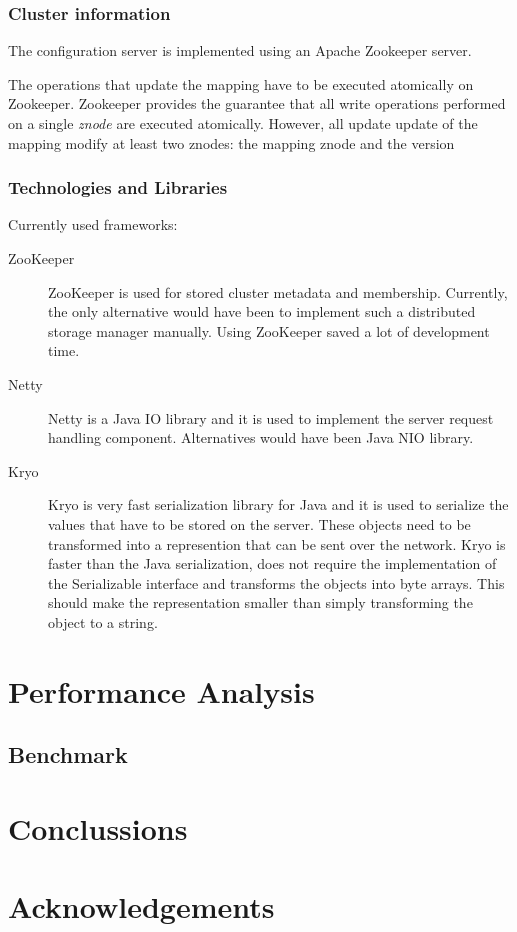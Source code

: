 \documentclass[11pt,a4paper]{globis-book}
\begin{document}
\subsection{Cluster information}
The configuration server is implemented using an Apache Zookeeper server. 

The operations that update the mapping have to be executed atomically on Zookeeper. Zookeeper provides the guarantee that all write operations performed on a single \textit{znode} are executed atomically. However, all update update of the mapping modify at least two znodes: the mapping znode and the version  

\subsection{Technologies and Libraries}
Currently used frameworks:
\begin{description}
    \item[ZooKeeper] ZooKeeper is used for stored cluster metadata and membership. Currently, the only alternative would have been to implement such a distributed storage manager manually. Using ZooKeeper saved a lot of development time. 
    \item[Netty] Netty is a Java IO library and it is used to implement the server request handling component. Alternatives would have been Java NIO library.
    \item[Kryo] Kryo is very fast serialization library for Java and it is used to serialize the values that have to be stored on the server. These objects need to be transformed into a represention that can be sent over the network. Kryo is faster than the Java serialization, does not require the implementation of the Serializable interface and transforms the objects into byte arrays. This should make the representation smaller than simply transforming the object to a string.
\end{description}

\chapter{Performance Analysis}
\section{Benchmark}

\chapter{Conclussions}

\appendix

\listoffigures
\listoftables

\chapter*{Acknowledgements}

\newpage
\thispagestyle{empty}



\end{document}
